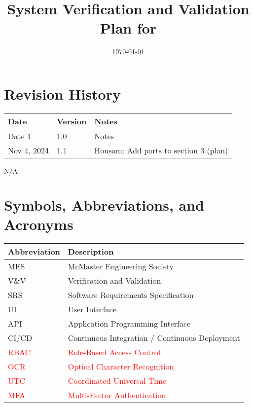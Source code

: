 \documentclass[12pt, titlepage]{article}
\begin{document}
\title{System Verification and Validation Plan for \progname{}}
\author{\authname}
\date{\today}

\maketitle


\section*{Revision History}

\begin{tabularx}{\textwidth}{p{3cm}p{2cm}X}
\toprule {\bf Date} & {\bf Version} & {\bf Notes}\\
\midrule
Date 1 & 1.0 & Notes\\
Nov 4, 2024 & 1.1 & Housam: Add parts to section 3 (plan)\\
\bottomrule
\end{tabularx}

\newpage

\tableofcontents

\listoftables

\listoffigures
N/A

\newpage

\section{Symbols, Abbreviations, and Acronyms}

\renewcommand{\arraystretch}{1.2}
\begin{tabular}{|p{3cm}|p{10cm}|}
    \hline
    \textbf{Abbreviation} & \textbf{Description} \\
    \hline
    MES & McMaster Engineering Society \\
    \hline
    V\&V & Verification and Validation \\
    \hline
    SRS & Software Requirements Specification \\
    \hline
    UI & User Interface \\
    \hline
    API & Application Programming Interface \\
    \hline
    CI/CD & Continuous Integration / Continuous Deployment \\
    \hline
    \textcolor{red}{RBAC} & \textcolor{red}{Role-Based Access Control} \\
    \hline
    \textcolor{red}{OCR} & \textcolor{red}{Optical Character Recognition} \\
    \hline
    \textcolor{red}{UTC} & \textcolor{red}{Coordinated Universal Time} \\
    \hline
    \textcolor{red}{MFA} & \textcolor{red}{Multi-Factor Authentication} \\
    \hline
\end{tabular}
\end{document}
